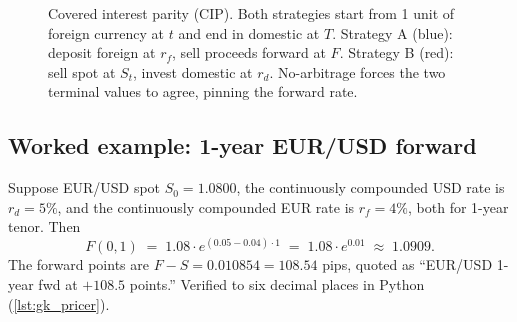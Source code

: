 \begin{figure}[htbp]
\centering
{}
\caption{Covered interest parity (CIP). Both strategies start from 1 unit of foreign
currency at $t$ and end in domestic at $T$. Strategy A (blue): deposit foreign at $r_f$,
sell proceeds forward at $F$. Strategy B (red): sell spot at $S_t$, invest domestic at
$r_d$. No-arbitrage forces the two terminal values to agree, pinning the forward rate.}
\label{fig:cip_strategies}
\end{figure}

\subsection{Worked example: 1-year EUR/USD forward}
\label{subsec:cip_example}

Suppose EUR/USD spot $S_0 = 1.0800$, the continuously compounded USD
rate is $r_d = 5\%$, and the continuously compounded EUR rate is
$r_f = 4\%$, both for 1-year tenor.  Then
\begin{equation}
  F(0, 1) \;=\; 1.08 \cdot e^{(0.05 - 0.04) \cdot 1}
            \;=\; 1.08 \cdot e^{0.01}
            \;\approx\; 1.0909.
\end{equation}
The forward points are $F - S = 0.010854 = 108.54$ pips, quoted as
``EUR/USD 1-year fwd at $+108.5$ points.''  Verified to six decimal
places in Python (\cref{lst:gk_pricer}).

